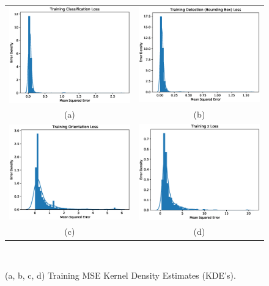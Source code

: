 \begin{figure}[!htbp]
  \centering
  \begin{tabular}{cc}
    \includegraphics[width=.4\linewidth]{figures/spp/quant/density/classification_loss.eps}&
		\includegraphics[width=.4\linewidth]{figures/spp/quant/density/detection_loss.eps}\\
    (a) & (b) \\
    \includegraphics[width=.4\linewidth]{figures/spp/quant/density/orientation_loss.eps}&
		\includegraphics[width=.4\linewidth]{figures/spp/quant/density/z_loss.eps}\\
    (c) & (d)
  \end{tabular}
  \caption[GP Shape Draws]
  {
    (a, b, c, d) Training MSE Kernel Density Estimates (KDE's).
  }
~\label{figure:spp_quant_density}
\end{figure}

